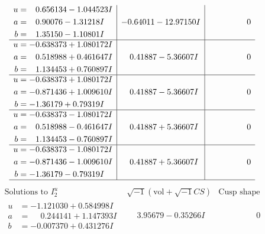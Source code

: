 \documentclass[1p]{elsarticle_modified}
\theoremstyle{definition}
\newcommand{\I}{\sqrt{-1}}
\begin{document}
$$\begin{array}{c|c|c}
\begin{aligned}
u &= \phantom{-}0.656134 - 1.044523 I \\
a &= \phantom{-}0.90076 - 1.31218 I \\
b &= \phantom{-}1.35150 - 1.10801 I\end{aligned}
 & -0.64011 - 12.97150 I & \phantom{-0.000000 } 0 \\ \hline\begin{aligned}
u &= -0.638373 + 1.080172 I \\
a &= \phantom{-}0.518988 + 0.461647 I \\
b &= \phantom{-}1.134453 + 0.760897 I\end{aligned}
 & \phantom{-}0.41887 - 5.36607 I & \phantom{-0.000000 } 0 \\ \hline\begin{aligned}
u &= -0.638373 + 1.080172 I \\
a &= -0.871436 + 1.009610 I \\
b &= -1.36179 + 0.79319 I\end{aligned}
 & \phantom{-}0.41887 - 5.36607 I & \phantom{-0.000000 } 0 \\ \hline\begin{aligned}
u &= -0.638373 - 1.080172 I \\
a &= \phantom{-}0.518988 - 0.461647 I \\
b &= \phantom{-}1.134453 - 0.760897 I\end{aligned}
 & \phantom{-}0.41887 + 5.36607 I & \phantom{-0.000000 } 0 \\ \hline\begin{aligned}
u &= -0.638373 - 1.080172 I \\
a &= -0.871436 - 1.009610 I \\
b &= -1.36179 - 0.79319 I\end{aligned}
 & \phantom{-}0.41887 + 5.36607 I & \phantom{-0.000000 } 0\\
 \hline 
 \end{array}$$\newpage$$\begin{array}{c|c|c}  
\text{Solutions to }I^u_{2}& \I (\text{vol} + \sqrt{-1}CS) & \text{Cusp shape}\\
 \hline 
\begin{aligned}
u &= -1.121030 + 0.584998 I \\
a &= \phantom{-}0.244141 + 1.147393 I \\
b &= -0.007370 + 0.431276 I\end{aligned}
 & \phantom{-}3.95679 - 0.35266 I & \phantom{-0.000000 } 0 \\ \hline\begin{aligned}

\end{aligned}
\end{array}$$
\end{document}
